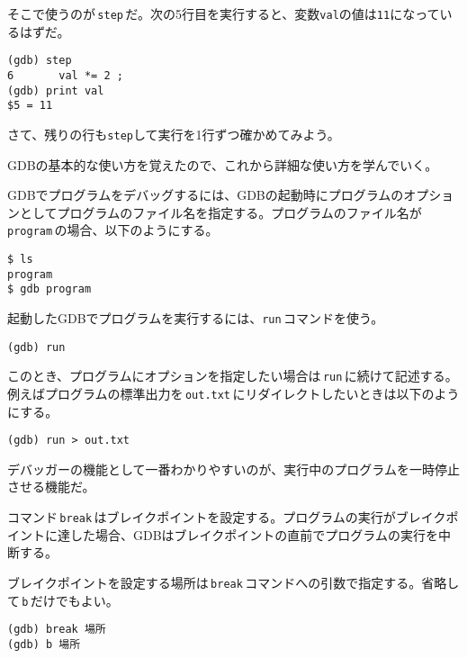 そこで使うのが\,\texttt{step}\,だ。次の5行目を実行すると、変数\texttt{val}の値は\texttt{11}になっているはずだ。

\begin{lstlisting}[style=terminal]
(gdb) step
6       val *= 2 ;
(gdb) print val
$5 = 11
\end{lstlisting}

さて、残りの行も\texttt{step}して実行を1行ずつ確かめてみよう。

GDBの基本的な使い方を覚えたので、これから詳細な使い方を学んでいく。

\clearpage
{}

GDBでプログラムをデバッグするには、GDBの起動時にプログラムのオプションとしてプログラムのファイル名を指定する。プログラムのファイル名が\,\texttt{program}\,の場合、以下のようにする。

\begin{lstlisting}[style=terminal]
$ ls
program
$ gdb program
\end{lstlisting}

起動したGDBでプログラムを実行するには、\texttt{run}\,コマンドを使う。

\begin{lstlisting}[style=terminal]
(gdb) run
\end{lstlisting}

このとき、プログラムにオプションを指定したい場合は\,\texttt{run}\,に続けて記述する。例えばプログラムの標準出力を\,\texttt{out.txt}\,にリダイレクトしたいときは以下のようにする。

\begin{lstlisting}[style=terminal]
(gdb) run > out.txt
\end{lstlisting}


デバッガーの機能として一番わかりやすいのが、実行中のプログラムを一時停止させる機能だ。


コマンド\,\texttt{break}\,はブレイクポイントを設定する。プログラムの実行がブレイクポイントに達した場合、GDBはブレイクポイントの直前でプログラムの実行を中断する。

ブレイクポイントを設定する場所は\,\texttt{break}\,コマンドへの引数で指定する。省略して\,\texttt{b}\,だけでもよい。

\begin{lstlisting}[style=terminal]
(gdb) break 場所
(gdb) b 場所
\end{lstlisting}

